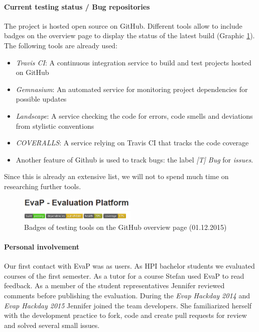 \paragraph{Current testing status / Bug repositories}
The project is hosted open source on GitHub.
Different tools allow to include badges on the overview page to display the status of the latest build (Graphic \ref{fig:testing-tools}).
The following tools are already used:
\begin{itemize}
    \item \emph{Travis CI}: 
    A continuous integration service to build and test projects hosted on GitHub
    \item \emph{Gemnasium}:
     An automated service for monitoring project dependencies for possible updates
     \item \emph{Landscape}:
     A service checking the code for errors, code smells and deviations from stylistic conventions
     \item  \emph{COVERALLS}:
     A service relying on Travis CI that tracks the code coverage
     \item 
     Another feature of Github is used to track bugs: the label \emph{[T] Bug} for \emph{issues}.
\end{itemize}
Since this is already an extensive list, we will not to spend much time on researching further tools. 
\begin{figure}[h]
    \centering
    \includegraphics[width=0.5\textwidth, keepaspectratio]{graphics/testing-tools-github}
    \caption{Badges of testing tools on the GitHub overview page (01.12.2015)}
    \label{fig:testing-tools}
\end{figure}


\paragraph{Personal involvement}
Our first contact with EvaP was as users. 
As HPI bachelor students we evaluated courses of the first semester.
As a tutor for a course Stefan used EvaP to read feedback.
As a member of the student representatives Jennifer reviewed comments before publishing the evaluation.
During the \emph{Evap Hackday 2014} and \emph{Evap Hackday 2015} Jennifer joined the team developers.
She familiarized herself with the development practice to fork, code and create pull requests for review and solved several small issues.
